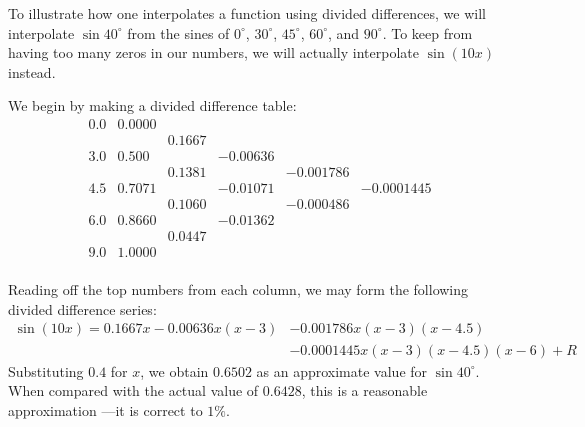 \documentclass[12pt]{article}
\begin{document}
To illustrate how one interpolates a function using
divided differences, we will interpolate $\sin 40^\circ$
from the sines of $0^\circ$, $30^\circ$, $45^\circ$,
$60^\circ$, and $90^\circ$.  To keep from having too 
many zeros in our numbers, we will actually
interpolate $\sin (10 x)$ instead.

We begin by making a divided difference table:
\[
\begin{matrix}
0.0 & 0.0000  &        &          &           & \\
    &        & 0.1667 &          &           & \\
3.0 & 0.500  &        & -0.00636 &           & \\
    &        & 0.1381 &          & -0.001786 & \\
4.5 & 0.7071 &        & -0.01071 &           & -0.0001445 \\
    &        & 0.1060 &          & -0.000486 & \\
6.0 & 0.8660 &        & -0.01362 &           & \\
    &        & 0.0447 &          &           & \\
9.0 & 1.0000  &        &          &           & \\
\end{matrix}
\]

Reading off the top numbers from each column, we may
form the following divided difference series:
\begin{align*}
\sin (10 x) = 0.1667 x - 0.00636 x (x-3) &- 
0.001786 x (x-3) (x-4.5) \\ &-
0.0001445 x (x-3) (x-4.5) (x-6) + R
\end{align*}
Substituting $0.4$ for $x$, we obtain $0.6502$ as
an approximate value for $\sin 40^\circ$.  When
compared with the actual value of $0.6428$, this
is a reasonable approximation ---it is correct
to $1 \%$.
\end{document}
